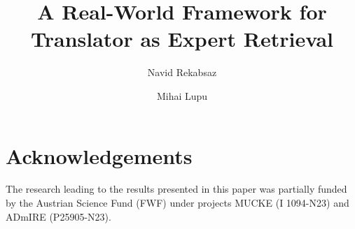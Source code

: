 


\title{A Real-World Framework for Translator as Expert Retrieval}


\author{Navid Rekabsaz \and Mihai Lupu}
%
%
%



\maketitle


\begin{abstract}

\end{abstract}









\section*{Acknowledgements}
\vspace{-0.3cm}
The research leading to the results presented in this paper was partially funded by the Austrian Science Fund (FWF) under projects MUCKE (I 1094-N23) and ADmIRE (P25905-N23).
\vspace{-0.3cm}






